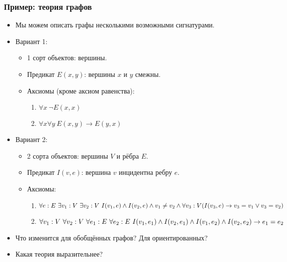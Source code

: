 \documentclass[10pt]{beamer}
\begin{document}
\begin{frame}
    \frametitle{Пример: теория графов}
    \begin{itemize}
        \item Мы можем описать графы несколькими возможными сигнатурами. 
        \item Вариант 1:
        \begin{itemize}
            \item 1 сорт объектов: вершины.
            \item Предикат $E(x,y)$: вершины $x$ и $y$ смежны.
            \item Аксиомы (кроме аксиом равенства):
            \pause
            \begin{enumerate}
                \item $\forall x ~ \neg E(x,x)$
                \item $\forall x \forall y ~ E(x,y) \to E(y,x)$
            \end{enumerate}
        \end{itemize}
        \pause
        \item Вариант 2:
        \begin{itemize}
            \item 2 сорта объектов: вершины $V$ и рёбра $E$.
            \item Предикат $I(v,e)$: вершина $v$ инцидентна ребру $e$.
            \item Аксиомы:
            \pause
            \begin{enumerate}
                \item $\forall e \nolinebreak : \nolinebreak E ~ \exists v_1 \nolinebreak : \nolinebreak V ~ \exists v_2 \nolinebreak : \nolinebreak V ~ I(v_1,e) \land I(v_2,e) \land v_1 \neq v_2 \land \linebreak \forall v_3 \nolinebreak : \nolinebreak V (I(v_3,e) \to v_3 = v_1 \lor v_3 = v_2)$
                \item $\forall v_1 \nolinebreak : \nolinebreak V ~ \forall v_2 \nolinebreak : \nolinebreak V ~  \forall e_1 \nolinebreak : \nolinebreak E ~ \forall e_2 \nolinebreak : \nolinebreak E ~ \linebreak I(v_1,e_1) \land I(v_2,e_1) \land I(v_1,e_2) \land I(v_2,e_2) \to e_1 = e_2$
            \end{enumerate}
        \end{itemize}
    \pause
    \item Что изменится для обобщённых графов? Для ориентированных?
    \pause
    \item Какая теория выразительнее?
    \end{itemize}
\end{frame}
\end{document}
